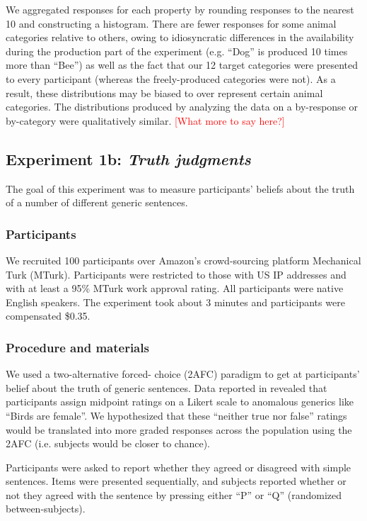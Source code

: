 \documentclass[10pt,letterpaper]{article}
\newcommand{\red}[1]{\textcolor{Red}{#1}}
\begin{document}
We aggregated responses for each property by rounding responses to the nearest 10 and constructing a histogram. There are fewer responses for some animal categories relative to others, owing to idiosyncratic differences in the availability during the production part of the experiment (e.g. ``Dog'' is produced 10 times more than ``Bee'') as well as the fact that our 12 target categories were presented to every participant (whereas the freely-produced categories were not). As a result, these distributions may be biased to over represent certain animal categories. The distributions produced by analyzing the data on a by-response or by-category were qualitatively similar. \red{[What more to say here?]}


\subsection{Experiment 1b: \emph{Truth judgments}}

The goal of this experiment was to measure participants' beliefs about the truth of a number of different generic sentences. 


\subsubsection{Participants}

We recruited 100 participants over Amazon's crowd-sourcing platform Mechanical Turk (MTurk).  Participants were restricted to those with US IP addresses and with at least a 95\% MTurk work approval rating. All participants were native English speakers. The experiment took about 3 minutes and participants were compensated \$0.35.

\subsubsection{Procedure and materials}

We used a two-alternative forced- choice (2AFC) paradigm to get at participants' belief about the truth of generic sentences. Data reported in  revealed that participants assign midpoint ratings on a Likert scale to anomalous generics like ``Birds are female''. We hypothesized that these ``neither true nor false'' ratings would be translated into more graded responses across the population using the 2AFC (i.e. subjects would be closer to chance).

Participants were asked to report whether they agreed or disagreed with simple sentences. Items were presented sequentially, and subjects reported whether or not they agreed with the sentence by pressing either ``P'' or ``Q'' (randomized between-subjects). 
\end{document}
